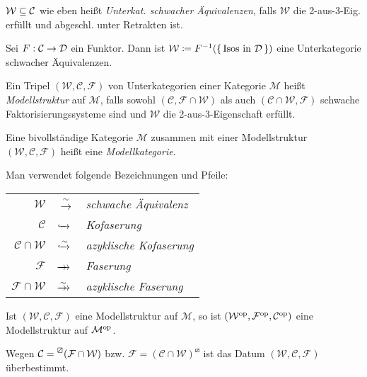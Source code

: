 \documentclass{cheat-sheet}
\newcommand{\nspace}[1]{\foreach \i in {1,...,#1}{ \! }} %
\newcommand{\xtwoheadrightarrow}[1]{\xrightarrow{#1}\nspace{8}\to\,\,} %
\newcommand{\lhhe}{\boxslash} %
\newcommand{\Weak}{\mathcal{W}} %
\newcommand{\Cof}{\mathcal{C}} %
\newcommand{\Fib}{\mathcal{F}} %
\newcommand{\ModC}{\mathcal{M}} %
\newcommand{\ModStr}{$(\Weak, \Cof, \Fib)$} %
\begin{document}
\begin{defn}
  $\Weak \subseteq \Cat$ wie eben heißt \emph{Unterkat. schwacher Äquivalenzen}, falls $\Weak$ die 2-aus-3-Eig. erfüllt und abgeschl. unter Retrakten ist.
\end{defn}

\begin{bsp}
  Sei $F : \mathcal{C} \to \mathcal{D}$ ein Funktor. Dann ist $\Weak \coloneqq F^{-1}(\{ \, \text{Isos in $\Dat$} \, \})$ eine Unterkategorie schwacher Äquivalenzen.
\end{bsp}

\begin{defn}
  Ein Tripel $(\Weak, \Cof, \Fib)$ von Unterkategorien einer Kategorie $\ModC$ heißt \emph{Modellstruktur} auf $\ModC$, falls sowohl $(\Cof, \Fib \cap \Weak)$ als auch $(\Cof \cap \Weak, \Fib)$ schwache Faktorisierungssysteme sind und $\Weak$ die 2-aus-3-Eigenschaft erfüllt.
\end{defn}

\begin{defn}
  Eine bivollständige Kategorie $\ModC$ zusammen mit einer Modellstruktur \ModStr{} heißt eine \emph{Modellkategorie}.
\end{defn}

\begin{sprech}
  Man verwendet folgende Bezeichnungen und Pfeile:
  \begin{center}
    \begin{tabular}{r l l}
      $\Weak$ & $\xrightarrow{{\sim}}$ & \emph{schwache Äquivalenz} \\
      $\Cof$ & $\xhookrightarrow{\phantom{{\sim}}}$ & \emph{Kofaserung} \\
      $\Cof \cap \Weak$ & $\xhookrightarrow{{\sim}}$ & \emph{azyklische Kofaserung} \\
      $\Fib$ & $\xtwoheadrightarrow{\phantom{{\sim}}}$ & \emph{Faserung} \\
      $\Fib \cap \Weak$ & $\xtwoheadrightarrow{{\sim}}$ & \emph{azyklische Faserung}
    \end{tabular}
  \end{center}
\end{sprech}

\begin{bem}
  Ist $(\Weak, \Cof, \Fib)$ eine Modellstruktur auf $\ModC$, so ist $(\Weak^\op, \Fib^\op, \Cof^\op)$ eine Modellstruktur auf $\ModC^\op$.
\end{bem}

\begin{bem}
  Wegen $\Cof = \prescript{\lhhe}{} (\Fib \cap \Weak)$ bzw. $\Fib = (\Cof \cap \Weak)^\lhhe$ ist das Datum $(\Weak, \Cof, \Fib)$ überbestimmt.
\end{bem}
\end{document}
